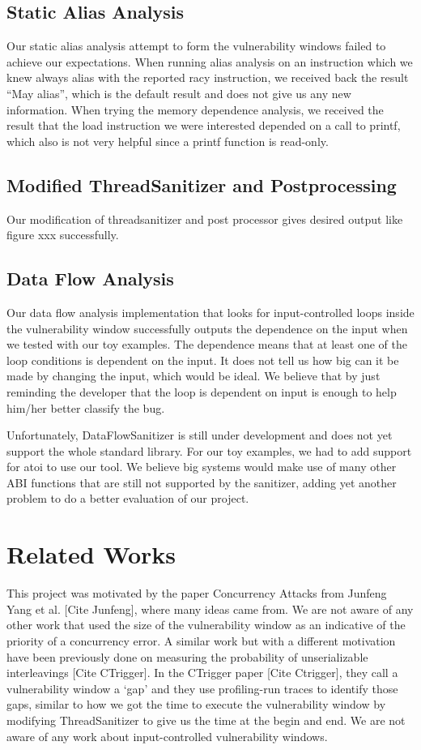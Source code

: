 \documentclass{acm_proc_article-sp}
\begin{document}
\subsection{Static Alias Analysis}
Our static alias analysis attempt to form the vulnerability windows failed to achieve our expectations. When running alias analysis on an instruction which we knew always alias with the reported racy instruction, we received back the result “May alias”, which is the default result and does not give us any new information. When trying the memory dependence analysis, we received the result that the load instruction we were interested depended on a call to printf, which also is not very helpful since a printf function is read-only.

\subsection{Modified ThreadSanitizer and Postprocessing}
Our modification of threadsanitizer and post processor gives desired output like figure xxx successfully. 

\subsection{Data Flow Analysis}
Our data flow analysis implementation that looks for input-controlled loops inside the vulnerability window successfully outputs the dependence on the input when we tested with our toy examples. The dependence means that at least one of the loop conditions is dependent on the input. It does not tell us how big can it be made by changing the input, which would be ideal. We believe that by just reminding the developer that the loop is dependent on input is enough to help him/her better classify the bug.

Unfortunately, DataFlowSanitizer is still under development and does not yet support the whole standard library. For our toy examples, we had to add support for atoi to use our tool. We believe big systems would make use of many other ABI functions that are still not supported by the sanitizer, adding yet another problem to do a better evaluation of our project.


\section{Related Works}
This project was motivated by the paper Concurrency Attacks from Junfeng Yang et al. [Cite Junfeng], where many ideas came from. We are not aware of any other work that used the size of the vulnerability window as an indicative of the priority of a concurrency error. A similar work but with a different motivation have been previously done on measuring the probability of unserializable interleavings [Cite CTrigger]. In the CTrigger paper [Cite Ctrigger], they call a vulnerability window a ‘gap’ and they use profiling-run traces to identify those gaps, similar to how we got the time to execute the vulnerability window by modifying ThreadSanitizer to give us the time at the begin and end. We are not aware of any work about input-controlled vulnerability windows.
\end{document}
